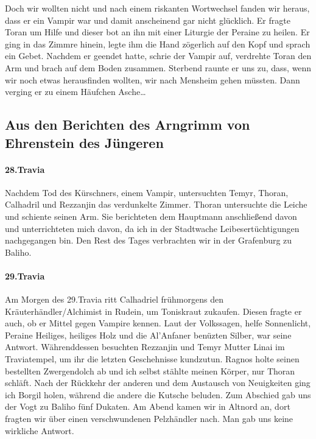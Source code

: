 Doch wir wollten nicht und nach einem riskanten Wortwechsel fanden wir heraus, dass er ein Vampir war und damit anscheinend gar nicht glücklich. Er fragte Toran um Hilfe und dieser bot an ihn mit einer Liturgie der Peraine zu heilen. Er ging in das Zimmre hinein, legte ihm die Hand zögerlich auf den Kopf und sprach ein Gebet. Nachdem er geendet hatte, schrie der Vampir auf, verdrehte Toran den Arm und brach auf dem Boden zusammen. Sterbend raunte er uns zu, dass, wenn wir noch etwas herausfinden wollten, wir nach Mensheim gehen müssten. Dann verging er zu einem Häufchen Asche\dots 

\subsection{Aus den Berichten des Arngrimm von Ehrenstein des Jüngeren}

\paragraph{28.Travia}
Nachdem Tod des Kürschners, einem Vampir, untersuchten Temyr, Thoran, Calhadril und Rezzanjin das verdunkelte Zimmer. Thoran untersuchte die Leiche und schiente seinen Arm. Sie berichteten dem Hauptmann anschließend davon und unterrichteten mich davon, da ich in der Stadtwache Leibesertüchtigungen nachgegangen bin. Den Rest des Tages verbrachten wir in der Grafenburg zu Baliho.

\paragraph{29.Travia}
Am Morgen des 29.Travia ritt Calhadriel frühmorgens den Kräuterhändler/Alchimist in Rudein, um Toniskraut zukaufen. Diesen fragte er auch, ob er Mittel gegen Vampire kennen. Laut der Volkssagen, helfe Sonnenlicht, Peraine Heiliges, heiliges Holz und die Al'Anfaner benüzten Silber, war seine Antwort. Währenddessen besuchten Rezzanjin und Temyr Mutter Linai im Traviatempel, um ihr die letzten Geschehnisse kundzutun. Ragnos holte seinen bestellten Zwergendolch ab und ich selbst stählte meinen Körper, nur Thoran schläft. Nach der Rückkehr der anderen und dem Austausch von Neuigkeiten ging ich Borgil holen, während die andere die Kutsche beluden. Zum Abschied gab uns der Vogt zu Baliho fünf Dukaten. Am Abend kamen wir in Altnord an, dort fragten wir über einen verschwundenen Pelzhändler nach. Man gab uns keine wirkliche Antwort.

